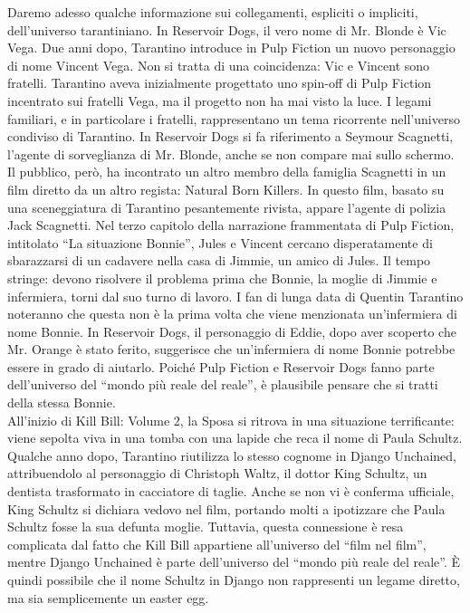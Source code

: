\documentclass[12pt]{article} %
\begin{document}
\begin{flushleft}
Daremo adesso qualche informazione sui collegamenti, espliciti o impliciti, dell'universo tarantiniano. In Reservoir Dogs, il vero nome di Mr. Blonde è Vic Vega. Due anni dopo, Tarantino introduce in Pulp Fiction un nuovo personaggio di nome Vincent Vega. Non si tratta di una coincidenza: Vic e Vincent sono fratelli. Tarantino aveva inizialmente progettato uno spin-off di Pulp Fiction incentrato sui fratelli Vega, ma il progetto non ha mai visto la luce. I legami familiari, e in particolare i fratelli, rappresentano un tema ricorrente nell’universo condiviso di Tarantino. In Reservoir Dogs si fa riferimento a Seymour Scagnetti, l’agente di sorveglianza di Mr. Blonde, anche se non compare mai sullo schermo. Il pubblico, però, ha incontrato un altro membro della famiglia Scagnetti in un film diretto da un altro regista: Natural Born Killers. 
In questo film, basato su una sceneggiatura di Tarantino pesantemente rivista, appare l'agente di polizia Jack Scagnetti.
Nel terzo capitolo della narrazione frammentata di Pulp Fiction, intitolato “La situazione Bonnie”, Jules e Vincent cercano disperatamente di sbarazzarsi di un cadavere nella casa di Jimmie, un amico di Jules. Il tempo stringe: devono risolvere il problema prima che Bonnie, la moglie di Jimmie e infermiera, torni dal suo turno di lavoro. I fan di lunga data di Quentin Tarantino noteranno che questa non è la prima volta che viene menzionata un'infermiera di nome Bonnie. In Reservoir Dogs, il personaggio di Eddie, dopo aver scoperto che Mr. Orange è stato ferito, suggerisce che un’infermiera di nome Bonnie potrebbe essere in grado di aiutarlo. Poiché Pulp Fiction e Reservoir Dogs fanno parte dell'universo del “mondo più reale del reale”, è plausibile pensare che si tratti della stessa Bonnie.
\\\vspace{1cm} All’inizio di Kill Bill: Volume 2, la Sposa si ritrova in una situazione terrificante: viene sepolta viva in una tomba con una lapide che reca il nome di Paula Schultz. Qualche anno dopo, Tarantino riutilizza lo stesso cognome in Django Unchained, attribuendolo al personaggio di Christoph Waltz, il dottor King Schultz, un dentista trasformato in cacciatore di taglie. Anche se non vi è conferma ufficiale, King Schultz si dichiara vedovo nel film, portando molti a ipotizzare che Paula Schultz fosse la sua defunta moglie. Tuttavia, questa connessione è resa complicata dal fatto che Kill Bill appartiene all’universo del “film nel film”, mentre Django Unchained è parte dell’universo del “mondo più reale del reale”. È quindi possibile che il nome Schultz in Django non rappresenti un legame diretto, ma sia semplicemente un easter egg.\\\vspace{1cm}

\end{flushleft}
\end{document}
